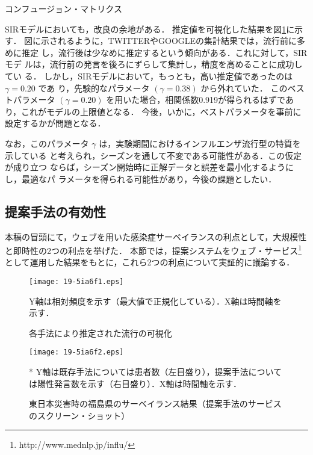 \documentclass[japanese]{jnlp_1.4}
\begin{document}
\begin{table}[b]
\caption{コンフュージョン・マトリクス}
\label{t_confusion}

\end{table}

SIRモデルにおいても，改良の余地がある．
推定値を可視化した結果を図\ref{f_result.eps}に示す．
図に示されるように，TWITTERやGOOGLEの集計結果では，流行前に多めに推定
し，流行後は少なめに推定するという傾向がある．これに対して，SIRモデ
ルは，流行前の発言を後ろにずらして集計し，精度を高めることに成功してい
る．
しかし，SIRモデルにおいて，もっとも，高い推定値であったのは $\gamma=0.20$ であ
り，先験的なパラメータ $(\gamma=0.38)$ から外れていた．
このベストパラメータ $(\gamma=0.20)$ を用いた場合，相関係数0.919が得られるはずであり，これがモデルの上限値となる．
今後，いかに，ベストパラメータを事前に設定するかが問題となる．

なお，このパラメータ $\gamma$ は，実験期間におけるインフルエンザ流行型の特質を示している
と考えられ，シーズンを通して不変である可能性がある．この仮定が成り立つ
ならば，シーズン開始時に正解データと誤差を最小化するようにし，最適なパ
ラメータを得られる可能性があり，今後の課題としたい．





\subsection{提案手法の有効性}

本稿の冒頭にて，ウェブを用いた感染症サーベイランスの利点として，大規模性と即時性の2つの利点を挙げた．
本節では，提案システムをウェブ・サービス\footnote{http://www.mednlp.jp/influ/}として運用した結果をもとに，これら2つの利点について実証的に議論する．

\begin{figure}[b]
\begin{center}
\texttt{[image: 19-5ia6f1.eps]}
\end{center}
\caption{各手法により推定された流行の可視化}
\label{f_result.eps}
\centerline{\footnotesize * Y軸は相対頻度を示す（最大値で正規化している）．X軸は時間軸を示す．}
\end{figure}
\begin{figure}[b]
\begin{center}
\texttt{[image: 19-5ia6f2.eps]}
\end{center}
\caption{東日本災害時の福島県のサーベイランス結果（提案手法のサービスのスクリーン・ショット）}
\label{f_result2}
\footnotesize{* Y軸は既存手法については患者数（左目盛り），提案手法については陽性発言数を示す（右目盛り）．X軸は時間軸を示す．}
\end{figure}
\end{document}
